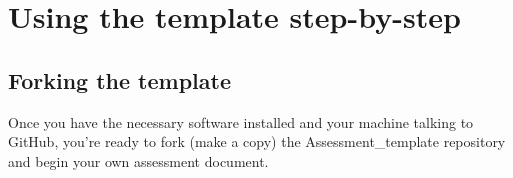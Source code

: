 \documentclass[12pt,]{article}
\begin{document}
\colorbox{light-gray}{}

\colorbox{light-gray}{}

\section{Using the template
step-by-step}\label{using-the-template-step-by-step}

\subsection{Forking the template}\label{forking-the-template}

Once you have the necessary software installed and your machine talking
to GitHub, you're ready to fork (make a copy) the Assessment\_template
repository and begin your own assessment document.
\end{document}
